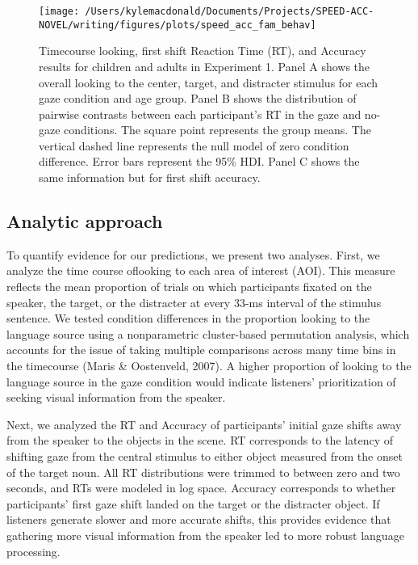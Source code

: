 \documentclass[10pt, letterpaper]{article}
\newenvironment{CodeChunk}{}{}
\begin{document}
\begin{CodeChunk}
\begin{figure*}[t]

{\centering \texttt{[image: /Users/kylemacdonald/Documents/Projects/SPEED-ACC-NOVEL/writing/figures/plots/speed\_acc\_fam\_behav]} 

}

\caption[Timecourse looking, first shift Reaction Time (RT), and Accuracy results for children and adults in Experiment 1]{Timecourse looking, first shift Reaction Time (RT), and Accuracy results for children and adults in Experiment 1. Panel A shows the overall looking to the center, target, and distracter stimulus for each gaze condition and age group. Panel B shows the distribution of pairwise contrasts between each participant's RT in the gaze and no-gaze conditions. The square point represents the group means. The vertical dashed line represents the null model of zero condition difference. Error bars represent the 95\% HDI. Panel C shows the same information but for first shift accuracy.}\label{fig:speed-acc-gaze-results}
\end{figure*}
\end{CodeChunk}

\hypertarget{analytic-approach}{%
\subsection{Analytic approach}\label{analytic-approach}}

To quantify evidence for our predictions, we present two analyses.
First, we analyze the time course oflooking to each area of interest
(AOI). This measure reflects the mean proportion of trials on which
participants fixated on the speaker, the target, or the distracter at
every 33-ms interval of the stimulus sentence. We tested condition
differences in the proportion looking to the language source using a
nonparametric cluster-based permutation analysis, which accounts for the
issue of taking multiple comparisons across many time bins in the
timecourse (Maris \& Oostenveld, 2007). A higher proportion of looking
to the language source in the gaze condition would indicate listeners'
prioritization of seeking visual information from the speaker.

Next, we analyzed the RT and Accuracy of participants' initial gaze
shifts away from the speaker to the objects in the scene. RT corresponds
to the latency of shifting gaze from the central stimulus to either
object measured from the onset of the target noun. All RT distributions
were trimmed to between zero and two seconds, and RTs were modeled in
log space. Accuracy corresponds to whether participants' first gaze
shift landed on the target or the distracter object. If listeners
generate slower and more accurate shifts, this provides evidence that
gathering more visual information from the speaker led to more robust
language processing.
\end{document}

